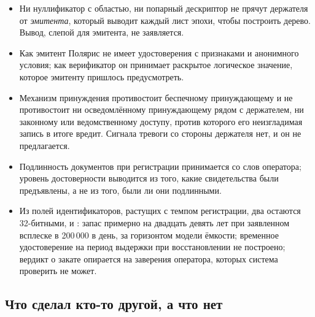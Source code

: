 \begin{itemize}
    показывает верификатору устойчивое значение токена, подпись эмитента и ключ держателя, а
    предъявление СД-ЖВТ ПУ показывает девять подписанных эмитентом значений, одинаковых повсюду.
    Дескриптор, свой для каждой доверяющей стороны, ограничивает то, что верификатор
    \emph{хранит}; лишь путь с нулевым разглашением ограничивает то, что ему \emph{показывают}, и
    эта граница есть размер эпохи, которому ничто не задаёт нижнего предела выше единицы и о
    котором не сообщает ни один вердикт.
  \item Ни нуллификатор с областью, ни попарный дескриптор не прячут держателя от
    \emph{эмитента}, который выводит каждый лист эпохи, чтобы построить дерево. Вывод, слепой для
    эмитента, не заявляется.
  \item Как эмитент Полярис не имеет удостоверения с признаками и анонимного условия; как
    верификатор он принимает раскрытое логическое значение, которое эмитенту пришлось
    предусмотреть.
  \item Механизм принуждения противостоит беспечному принуждающему и не противостоит ни
    осведомлённому принуждающему рядом с держателем, ни законному или ведомственному доступу,
    против которого его неизгладимая запись в итоге вредит. Сигнала тревоги со стороны держателя
    нет, и он не предлагается.
  \item Подлинность документов при регистрации принимается со слов оператора; уровень
    достоверности выводится из того, какие свидетельства были предъявлены, а не из того, были ли
    они подлинными.
  \item Из полей идентификаторов, растущих с темпом регистрации, два остаются 32-битными,
     и : запас примерно на двадцать девять
    лет при заявленном всплеске в 200\,000 в день, за горизонтом модели ёмкости; временное удостоверение на период выдержки при восстановлении не
    построено; вердикт о закате опирается на заверения оператора, которых система проверить не
    может.
\end{itemize}

\subsection{Что сделал кто-то другой, а что нет}

